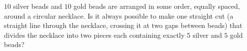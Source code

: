$10$ silver beads and $10$ gold beads are arranged in some order, equally spaced, around a circular necklace. Is it always possible to make one straight cut (a straight line through the necklace, crossing it at two gaps between beads) that divides the necklace into two pieces each containing exactly $5$ silver and $5$ gold beads?

